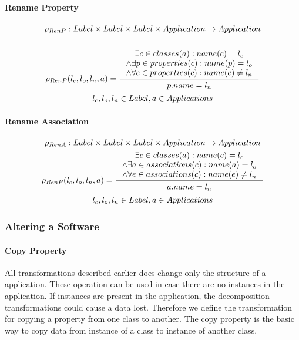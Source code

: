 \documentclass[11pt]{article}
\begin{document}
\paragraph{Rename Property}
\begin{gather*}
\rho_{RenP} : Label \times Label \times Label \times Application \rightarrow Application \\ \\
	\rho_{RenP}(l_c, l_o, l_n, a) = \inference{\exists c \in classes(a) : name(c) = l_c \\ \wedge \exists p \in properties(c) : name(p) = l_o \\ \wedge \forall e \in properties(c) : name(e) \neq l_n}{\begin{gathered}
p.name = l_n 
\end{gathered}}\\
l_c, l_o, l_n \in Label, a \in Applications
\end{gather*}

\paragraph{Rename Association}
\begin{gather*}
\rho_{RenA} : Label \times Label \times Label \times Application \rightarrow Application \\
	\rho_{RenP}(l_c, l_o, l_n, a) = \inference{\exists c \in classes(a) : name(c) = l_c \\ \wedge \exists a \in associations(c) : name(a) = l_o \\ \wedge \forall e \in associations(c) : name(e) \neq l_n}{\begin{gathered}
a.name = l_n 
\end{gathered}}\\
l_c, l_o, l_n \in Label, a \in Applications
\end{gather*}


\subsubsection{Altering a Software}	
\paragraph{Copy Property}
All transformations described earlier does change only the structure of a application. These operation can be used in case there are no instances in the application. If instances are present in the application, the decomposition transformations could cause a data lost. Therefore we define  the transformation for copying a property from one class to another. The copy property is the basic way to copy data from instance of a class to instance of another class.
\end{document}
